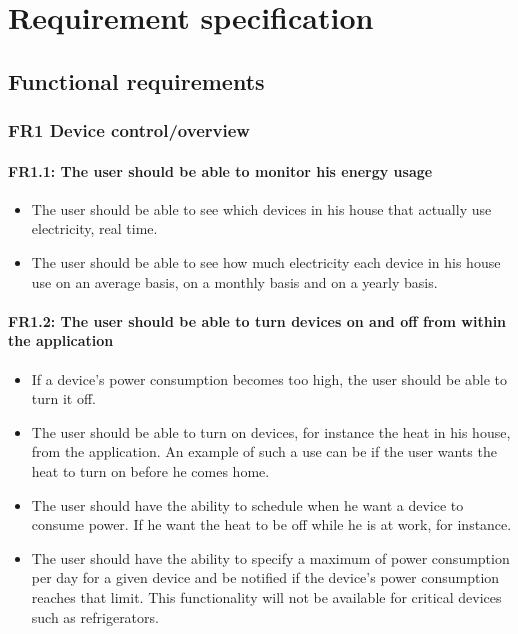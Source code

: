 \chapter{Requirement specification}
\section{Functional requirements}


\subsection{FR1 Device control/overview}
\subsubsection{FR1.1: The user should be able to monitor his energy usage}

\begin{itemize}
\item The user should be able to see which devices in his house that actually use electricity, real time.
\item The user should be able to see how much electricity each device in his house use on an average basis, on a monthly basis and on a yearly basis.
\end{itemize}

\subsubsection{FR1.2: The user should be able to turn devices on and off from within the application}
\begin{itemize}
\item If a device's power consumption becomes too high, the user should be able to turn it off.
\item The user should be able to turn on devices, for instance the heat in his house, from the application. An example of such a use can be if the user wants the heat to turn on before he comes home.
\item The user should have the ability to schedule when he want a device to consume power. If he want the heat to be off while he is at work, for instance. 
\item The user should have the ability to specify a maximum of power 
consumption per day for a given device and be notified if the device's power
consumption reaches that limit. This functionality will not be available
for critical devices such as refrigerators. 
\end{itemize}

